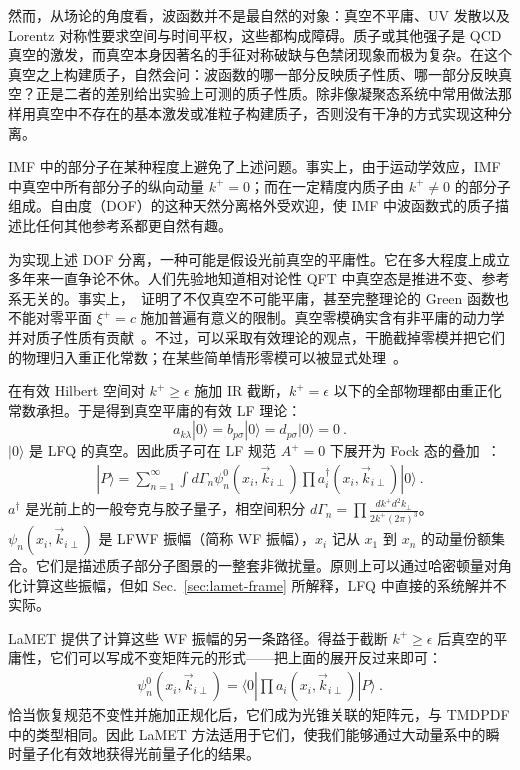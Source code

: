 然而，从场论的角度看，波函数并不是最自然的对象：真空不平庸、UV 发散以及 Lorentz 对称性要求空间与时间平权，这些都构成障碍。质子或其他强子是 QCD 真空的激发，而真空本身因著名的手征对称破缺与色禁闭现象而极为复杂。在这个真空之上构建质子，自然会问：波函数的哪一部分反映质子性质、哪一部分反映真空？正是二者的差别给出实验上可测的质子性质。除非像凝聚态系统中常用做法那样用真空中不存在的基本激发或准粒子构建质子，否则没有干净的方式实现这种分离。

IMF 中的部分子在某种程度上避免了上述问题。事实上，由于运动学效应，IMF 中真空中所有部分子的纵向动量 $k^+=0$；而在一定精度内质子由 $k^+\ne 0$ 的部分子组成。自由度（DOF）的这种天然分离格外受欢迎，使 IMF 中波函数式的质子描述比任何其他参考系都更自然有趣。

为实现上述 DOF 分离，一种可能是假设光前真空的平庸性。它在多大程度上成立多年来一直争论不休。人们先验地知道相对论性 QFT 中真空态是推进不变、参考系无关的。事实上，~\cite{Nakanishi:1976yx,Nakanishi:1976vf}证明了不仅真空不可能平庸，甚至完整理论的 Green 函数也不能对零平面 $\xi^+=c$ 施加普遍有意义的限制。真空零模确实含有非平庸的动力学并对质子性质有贡献~\cite{Ji:2020baz}。不过，可以采取有效理论的观点，干脆截掉零模并把它们的物理归入重正化常数；在某些简单情形零模可以被显式处理~\cite{Heinzl:1991myy,Yamawaki:1998cy}。

在有效 Hilbert 空间对 $k^+\ge \epsilon$ 施加 IR 截断，$k^+=\epsilon$ 以下的全部物理都由重正化常数承担。于是得到真空平庸的有效 LF 理论：
\begin{equation}
	a_{k\lambda}|0\rangle = b_{p\sigma}|0\rangle = d_{p\sigma}|0\rangle=0 \ .
\end{equation}
$|0\rangle $ 是 LFQ 的真空。因此质子可在 LF 规范 $A^+=0$ 下展开为 Fock 态的叠加~\cite{Brodsky:1997de}：
\begin{align}
	|P\rangle=\sum_{n=1}^{\infty} \int d\Gamma_n \psi^0_n(x_i,\vec{k}_{i\perp})\prod a^{\dagger}_i(x_i, \vec{k}_{i\perp})|0\rangle \ .
\end{align}
$a^\dagger$ 是光前上的一般夸克与胶子量子，相空间积分 $d\Gamma_n=\prod \frac{dk^+d^2k_\perp}{2k^+(2\pi)^3}$。$\psi_n(x_i,\vec{k}_{i\perp})$ 是 LFWF 振幅（简称 WF 振幅），$x_i$ 记从 $x_1$ 到 $x_n$ 的动量份额集合。它们是描述质子部分子图景的一整套非微扰量。原则上可以通过哈密顿量对角化计算这些振幅，但如 Sec.~\ref{sec:lamet-frame} 所解释，LFQ 中直接的系统解并不实际。

LaMET 提供了计算这些 WF 振幅的另一条路径。得益于截断 $k^+\ge \epsilon$ 后真空的平庸性，它们可以写成不变矩阵元的形式——把上面的展开反过来即可：
\begin{align}
	\psi^0_n(x_i,\vec{k}_{i\perp})=\langle 0|\prod a_i(x_i,\vec{k}_{i\perp})|P\rangle \ .
\end{align}
恰当恢复规范不变性并施加正规化后，它们成为光锥关联的矩阵元，与 TMDPDF 中的类型相同。因此 LaMET 方法适用于它们，使我们能够通过大动量系中的瞬时量子化有效地获得光前量子化的结果。

